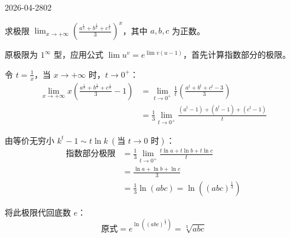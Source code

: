 \begin{mistake}{2026-04-28}{02}

\begin{problemcontent}
求极限 \(\displaystyle \lim_{x\to+\infty} \left( \frac{a^{\frac{1}{x}} + b^{\frac{1}{x}} + c^{\frac{1}{x}}}{3} \right)^x\)，其中 \(a,b,c\) 为正数。
\end{problemcontent}

\begin{solutioncontent}
原极限为 \(1^\infty\) 型，应用公式 \(\lim u^v = e^{\lim v(u-1)}\)，首先计算指数部分的极限。

令 \(t = \frac{1}{x}\)，当 \(x \to +\infty\) 时，\(t \to 0^+\)：
\[
\begin{aligned}
\lim_{x\to+\infty} x \left( \frac{a^{\frac{1}{x}} + b^{\frac{1}{x}} + c^{\frac{1}{x}}}{3} - 1 \right)
&= \lim_{t\to 0^+} \frac{1}{t} \left( \frac{a^t + b^t + c^t - 3}{3} \right) \\
&= \frac{1}{3} \lim_{t\to 0^+} \frac{(a^t - 1) + (b^t - 1) + (c^t - 1)}{t}
\end{aligned}
\]

由等价无穷小 \(k^t - 1 \sim t \ln k\ (\text{当 } t \to 0 \text{ 时})\)：
\[
\begin{aligned}
\text{指数部分极限} &= \frac{1}{3} \lim_{t\to 0^+} \frac{t\ln a + t\ln b + t\ln c}{t} \\
&= \frac{\ln a + \ln b + \ln c}{3} \\
&= \frac{1}{3}\ln(abc) = \ln\left((abc)^{\frac{1}{3}}\right)
\end{aligned}
\]

将此极限代回底数 \(e\)：
\[ \text{原式} = e^{\ln\left((abc)^{\frac{1}{3}}\right)} = \sqrt[3]{abc} \]
\end{solutioncontent}


\end{mistake}
